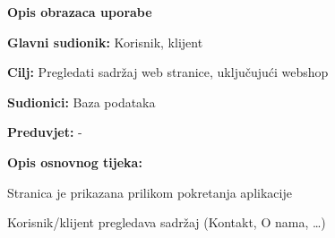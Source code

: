 				
				\textbf{Opis obrazaca uporabe}

				
				\noindent {}
				\begin{packed_item}
					
					\item \textbf{Glavni sudionik: } Korisnik, klijent
					\item  \textbf{Cilj:} Pregledati sadržaj web stranice, uključujući webshop
					\item  \textbf{Sudionici:} Baza podataka
					\item  \textbf{Preduvjet:}  - 
					\item  \textbf{Opis osnovnog tijeka:}
					
					\item[] \begin{packed_enum}
						\item Stranica je prikazana prilikom pokretanja aplikacije
						\item Korisnik/klijent pregledava sadržaj (Kontakt, O nama, …) 
					\end{packed_enum}
				\end{packed_item}
				
